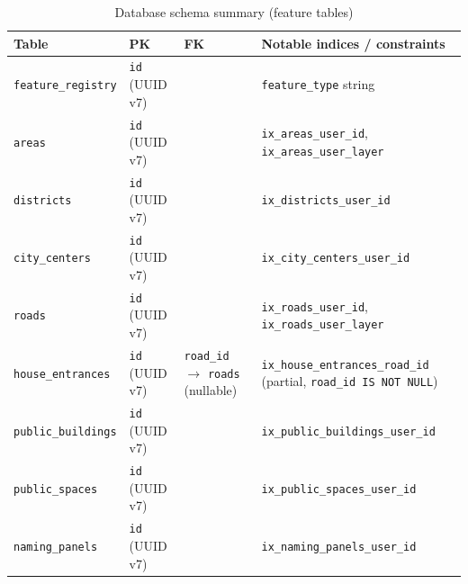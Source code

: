 \documentclass[12pt,a4paper]{article}
\theoremstyle{definition}
\theoremstyle{plain}
\theoremstyle{remark}
\begin{document}
\begin{table}[H]
\centering
\caption{Database schema summary (feature tables)}
\begin{tabularx}{\textwidth}{ll>{\raggedright\arraybackslash}X>{\raggedright\arraybackslash}X}
\toprule
\textbf{Table} & \textbf{PK} & \textbf{FK} & \textbf{Notable indices / constraints} \\
\midrule
\texttt{feature\_\allowbreak{}registry}
  & \texttt{id} (UUID v7)
  &
  & \texttt{feature\_\allowbreak{}type} string \\
\texttt{areas}
  & \texttt{id} (UUID v7)
  &
  & \texttt{ix\_\allowbreak{}areas\_\allowbreak{}user\_\allowbreak{}id}, \texttt{ix\_\allowbreak{}areas\_\allowbreak{}user\_\allowbreak{}layer} \\
\texttt{districts}
  & \texttt{id} (UUID v7)
  &
  & \texttt{ix\_\allowbreak{}districts\_\allowbreak{}user\_\allowbreak{}id} \\
\texttt{city\_\allowbreak{}centers}
  & \texttt{id} (UUID v7)
  &
  & \texttt{ix\_\allowbreak{}city\_\allowbreak{}centers\_\allowbreak{}user\_\allowbreak{}id} \\
\texttt{roads}
  & \texttt{id} (UUID v7)
  &
  & \texttt{ix\_\allowbreak{}roads\_\allowbreak{}user\_\allowbreak{}id}, \texttt{ix\_\allowbreak{}roads\_\allowbreak{}user\_\allowbreak{}layer} \\
\texttt{house\_\allowbreak{}entrances}
  & \texttt{id} (UUID v7)
  & \texttt{road\_\allowbreak{}id} $\to$ \texttt{roads} (nullable)
  & \texttt{ix\_\allowbreak{}house\_\allowbreak{}entrances\_\allowbreak{}road\_\allowbreak{}id} (partial, \texttt{road\_\allowbreak{}id IS NOT NULL}) \\
\texttt{public\_\allowbreak{}buildings}
  & \texttt{id} (UUID v7)
  &
  & \texttt{ix\_\allowbreak{}public\_\allowbreak{}buildings\_\allowbreak{}user\_\allowbreak{}id} \\
\texttt{public\_\allowbreak{}spaces}
  & \texttt{id} (UUID v7)
  &
  & \texttt{ix\_\allowbreak{}public\_\allowbreak{}spaces\_\allowbreak{}user\_\allowbreak{}id} \\
\texttt{naming\_\allowbreak{}panels}
  & \texttt{id} (UUID v7)
  &
  & \texttt{ix\_\allowbreak{}naming\_\allowbreak{}panels\_\allowbreak{}user\_\allowbreak{}id} \\
\bottomrule
\end{tabularx}
\end{table}
\end{document}
